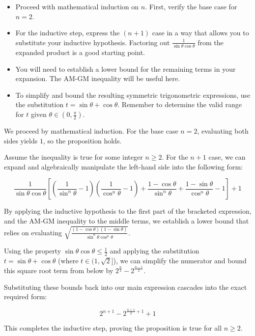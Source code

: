 \begin{hint}
\begin{itemize}[leftmargin=*]
    \item Proceed with mathematical induction on $n$. First, verify the base case for $n=2$.
    \item For the inductive step, express the $(n+1)$ case in a way that allows you to substitute your inductive hypothesis. Factoring out $\frac{1}{\sin\theta\cos\theta}$ from the expanded product is a good starting point.
    \item You will need to establish a lower bound for the remaining terms in your expansion. The AM-GM inequality will be useful here.
    \item To simplify and bound the resulting symmetric trigonometric expressions, use the substitution $t = \sin\theta + \cos\theta$. Remember to determine the valid range for $t$ given $\theta \in \left(0, \frac{\pi}{2}\right)$.
\end{itemize}
\end{hint}

\begin{solution}
We proceed by mathematical induction.
For the base case $n=2$, evaluating both sides yields $1$, so the proposition holds.

Assume the inequality is true for some integer $n \geqslant 2$. For the $n+1$ case, we can expand and algebraically manipulate the left-hand side into the following form:

\[
\frac{1}{\sin\theta\cos\theta} \left[ \left(\frac{1}{\sin^n\theta} - 1\right)\left(\frac{1}{\cos^n\theta} - 1\right) + \frac{1-\cos\theta}{\sin^n\theta} + \frac{1-\sin\theta}{\cos^n\theta} - 1 \right] + 1
\]

By applying the inductive hypothesis to the first part of the bracketed expression, and the AM-GM inequality to the middle terms, we establish a lower bound that relies on evaluating $\sqrt{\frac{(1-\cos\theta)(1-\sin\theta)}{\sin^n\theta\cos^n\theta}}$.

Using the property $\sin\theta\cos\theta \leqslant \frac{1}{2}$ and applying the substitution $t = \sin\theta + \cos\theta$ (where $t \in (1, \sqrt{2}]$), we can simplify the numerator and bound this square root term from below by $2^{\frac{n}{2}} - 2^{\frac{n-1}{2}}$.

Substituting these bounds back into our main expression cascades into the exact required form:

\[
2^{n+1} - 2^{\frac{n+1}{2}+1} + 1
\]

This completes the inductive step, proving the proposition is true for all $n \geqslant 2$.
\end{solution}

